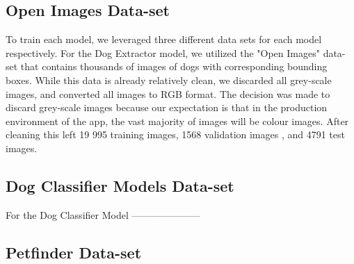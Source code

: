 \documentclass{article}
\begin{document}
\subsection{Open Images Data-set}

To train each model, we leveraged three different data sets for each model respectively.  For the Dog Extractor model, we utilized the "Open Images" \cite{openimages} data-set that contains thousands of images of dogs with corresponding bounding boxes.  While this data is already relatively clean, we discarded all grey-scale images, and converted all images to RGB format.  The decision was made to discard grey-scale images because our expectation is that in the production environment of the app, the vast majority of images will be colour images.  After cleaning this left 19 995 training images, 1568 validation images , and 4791 test images.

\subsection{Dog Classifier Models Data-set}

For the Dog Classifier Model ---------------------

\subsection{Petfinder Data-set}
\end{document}
